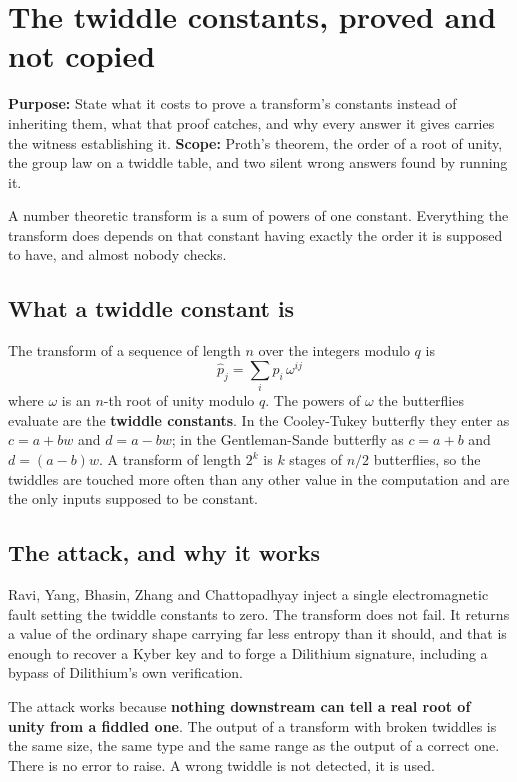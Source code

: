 \chapter{The twiddle constants, proved and not copied}

\textbf{Purpose:} State what it costs to prove a transform's constants instead of inheriting them, what that proof catches, and why every answer it gives carries the witness establishing it. \textbf{Scope:} Proth's theorem, the order of a root of unity, the group law on a twiddle table, and two silent wrong answers found by running it.

A number theoretic transform is a sum of powers of one constant. Everything the transform does depends on that constant having exactly the order it is supposed to have, and almost nobody checks.

\section{What a twiddle constant is}

The transform of a sequence of length \(n\) over the integers modulo \(q\) is
\[
\hat{p}_j = \sum_i p_i \, \omega^{ij}
\]
where \(\omega\) is an \(n\)-th root of unity modulo \(q\). The powers of \(\omega\) the butterflies evaluate are the \textbf{twiddle constants}. In the Cooley-Tukey butterfly they enter as \(c = a + bw\) and \(d = a - bw\); in the Gentleman-Sande butterfly as \(c = a + b\) and \(d = (a-b)w\). A transform of length \(2^k\) is \(k\) stages of \(n/2\) butterflies, so the twiddles are touched more often than any other value in the computation and are the only inputs supposed to be constant.

\section{The attack, and why it works}

Ravi, Yang, Bhasin, Zhang and Chattopadhyay inject a single electromagnetic fault setting the twiddle constants to zero. The transform does not fail. It returns a value of the ordinary shape carrying far less entropy than it should, and that is enough to recover a Kyber key and to forge a Dilithium signature, including a bypass of Dilithium's own verification.

The attack works because \textbf{nothing downstream can tell a real root of unity from a fiddled one}. The output of a transform with broken twiddles is the same size, the same type and the same range as the output of a correct one. There is no error to raise. A wrong twiddle is not detected, it is used.

